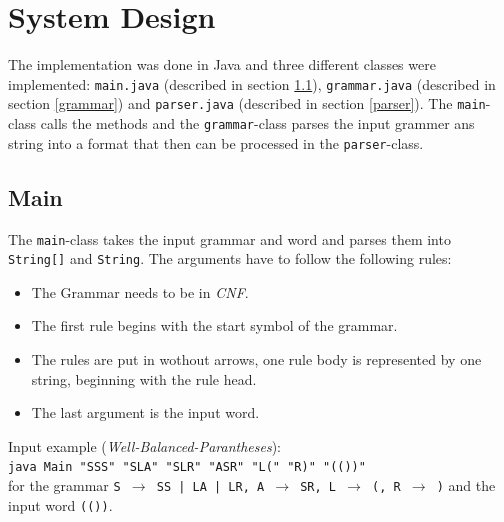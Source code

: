 \documentclass[a4paper, 11pt]{article}
\newcommand{\dq}{"}
\begin{document}



\pagebreak













\section{System Design}
\label{systemdesign}

The implementation was done in Java and three different classes were implemented: \texttt{main.java} (described in section \ref{main}), \texttt{grammar.java} (described in section \ref{grammar}) and \texttt{parser.java} (described in section \ref{parser}). The \texttt{main}-class calls the methods and the \texttt{grammar}-class parses the input grammer ans string into a format that then can be processed in the \texttt{parser}-class.





\subsection{Main}
\label{main}

The \texttt{main}-class takes the input grammar and word and parses them into \texttt{String[]} and \texttt{String}. The arguments have to follow the following rules:
\begin{itemize}
\item The Grammar needs to be in \textit{CNF}.
\item The first rule begins with the start symbol of the grammar.
\item The rules are put in wothout arrows, one rule body is represented by one string, beginning with the rule head.
\item The last argument is the input word.
\end{itemize}
Input example (\textit{Well-Balanced-Parantheses}):\\
  \texttt{java Main \dq SSS\dq \ \dq SLA\dq \ \dq SLR\dq \ \dq ASR\dq \ \dq L(\dq \ \dq R)\dq\  \dq (())\dq}
\\ 
for the grammar \texttt{S $\rightarrow$ SS | LA | LR, A $\rightarrow$ SR, L $\rightarrow$ (, R $\rightarrow$ )} and the input word \texttt{(())}. \\
\end{document}
